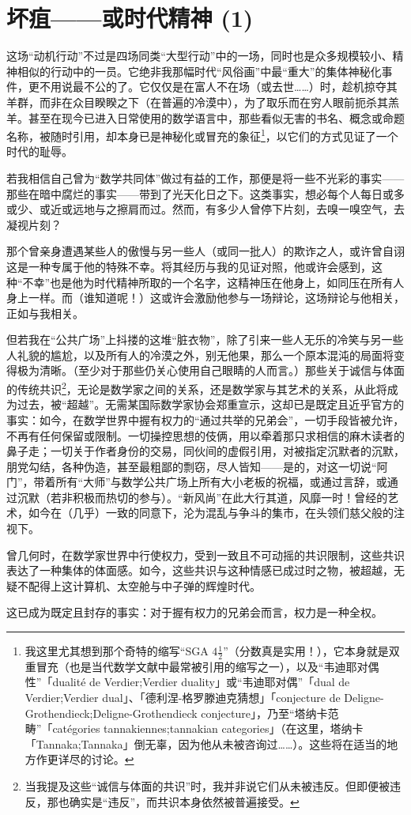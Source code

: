 \section{坏疽——或时代精神 (1)}

这场“动机行动”不过是四场同类“大型行动”中的一场，同时也是众多规模较小、精神相似的行动中的一员。它绝非我那幅时代“风俗画”中最“重大”的集体神秘化事件，更不用说最不公的了。它仅仅是在富人不在场（或去世……）时，趁机掠夺其羊群，而非在众目睽睽之下（在普遍的冷漠中），为了取乐而在穷人眼前扼杀其羔羊。甚至在现今已进入日常使用的数学语言中，那些看似无害的书名、概念或命题名称，被随时引用，却本身已是神秘化或冒充的象征\footnote{我这里尤其想到那个奇特的缩写“SGA $4 \frac{1}{2}$”（分数真是实用！），它本身就是双重冒充（也是当代数学文献中最常被引用的缩写之一），以及“韦迪耶对偶性”「dualité de Verdier;Verdier duality」或“韦迪耶对偶”「dual de Verdier;Verdier dual」、「德利涅-格罗滕迪克猜想」「conjecture de Deligne-Grothendieck;Deligne-Grothendieck conjecture」，乃至“塔纳卡范畴”「catégories tannakiennes;tannakian categories」（在这里，塔纳卡「Tannaka;Tannaka」倒无辜，因为他从未被咨询过……）。这些将在适当的地方作更详尽的讨论。}，以它们的方式见证了一个时代的耻辱。

若我相信自己曾为“数学共同体”做过有益的工作，那便是将一些不光彩的事实——那些在暗中腐烂的事实——带到了光天化日之下。这类事实，想必每个人每日或多或少、或近或远地与之擦肩而过。然而，有多少人曾停下片刻，去嗅一嗅空气，去凝视片刻？

那个曾亲身遭遇某些人的傲慢与另一些人（或同一批人）的欺诈之人，或许曾自诩这是一种专属于他的特殊不幸。将其经历与我的见证对照，他或许会感到，这种“不幸”也是他为时代精神所取的一个名字，这精神压在他身上，如同压在所有人身上一样。而（谁知道呢！）这或许会激励他参与一场辩论，这场辩论与他相关，正如与我相关。

但若我在“公共广场”上抖搂的这堆“脏衣物”，除了引来一些人无乐的冷笑与另一些人礼貌的尴尬，以及所有人的冷漠之外，别无他果，那么一个原本混沌的局面将变得极为清晰。（至少对于那些仍关心使用自己眼睛的人而言。）那些关于诚信与体面的传统共识\footnote{当我提及这些“诚信与体面的共识”时，我并非说它们从未被违反。但即便被违反，那也确实是“违反”，而共识本身依然被普遍接受。}，无论是数学家之间的关系，还是数学家与其艺术的关系，从此将成为过去，被“超越”。无需某国际数学家协会郑重宣示，这却已是既定且近乎官方的事实：如今，在数学世界中握有权力的“通过共举的兄弟会”，一切手段皆被允许，不再有任何保留或限制。一切操控思想的伎俩，用以牵着那只求相信的麻木读者的鼻子走；一切关于作者身份的交易，同伙间的虚假引用，对被指定沉默者的沉默，朋党勾结，各种伪造，甚至最粗鄙的剽窃，尽人皆知——是的，对这一切说“阿门”，带着所有“大师”与数学公共广场上所有大小老板的祝福，或通过言辞，或通过沉默（若非积极而热切的参与）。“新风尚”在此大行其道，风靡一时！曾经的艺术，如今在（几乎）一致的同意下，沦为混乱与争斗的集市，在头领们慈父般的注视下。

曾几何时，在数学家世界中行使权力，受到一致且不可动摇的共识限制，这些共识表达了一种集体的体面感。如今，这些共识与这种情感已成过时之物，被超越，无疑不配得上这计算机、太空舱与中子弹的辉煌时代。

这已成为既定且封存的事实：对于握有权力的兄弟会而言，权力是一种全权。